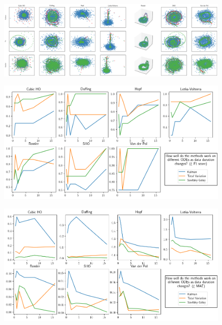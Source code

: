 \documentclass{article}
\begin{document}
\begin{table}
    \label{tab:results}
\end{table}


\begin{figure}
    \label{fig:train}
    \includegraphics[width=\textwidth]{images/summary_train}
\end{figure}
\begin{figure}
    \label{fig:f1}
    \includegraphics[width=\textwidth]{images/summary_f1_time.png}
\end{figure}
\begin{figure}
    \label{fig:mae}
    \includegraphics[width=\textwidth]{images/summary_mae_time.png}
\end{figure}
\end{document}
